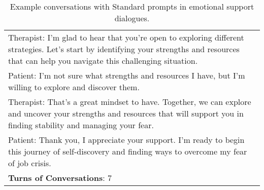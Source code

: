 \begin{table}[]
\begin{tabular}{p{13.5cm}}
    Therapist: I'm glad to hear that you're open to exploring different strategies. Let's start by identifying your strengths and resources that can help you navigate this challenging situation.\\
    Patient: I'm not sure what strengths and resources I have, but I'm willing to explore and discover them.\\
    Therapist: That's a great mindset to have. Together, we can explore and uncover your strengths and resources that will support you in finding stability and managing your fear.\\
    Patient: Thank you, I appreciate your support. I'm ready to begin this journey of self-discovery and finding ways to overcome my fear of job crisis. \\
    \midrule
    \textbf{Turns of Conversations}: 7 \\
    \bottomrule
    \end{tabular}
    \caption{Example conversations with Standard prompts in emotional support dialogues. }
    \label{tab:esc_case_1}
\end{table}



